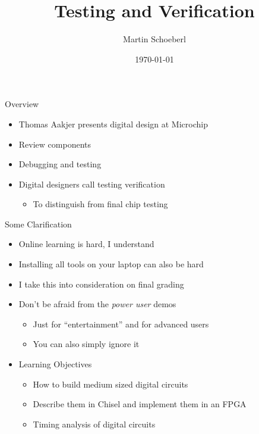 

\newif\ifbook


\title{Testing and Verification}
\author{Martin Schoeberl}
\date{\today}



\begin{frame}
\titlepage
\end{frame}

\begin{frame}[fragile]{Overview}
\begin{itemize}
\item Thomas Aakjer presents digital design at Microchip
\item Review components
\item Debugging and testing
\item Digital designers call testing verification
\begin{itemize}
\item To distinguish from final chip testing
\end{itemize}
\end{itemize}
\end{frame}

\begin{frame}[fragile]{Some Clarification}
\begin{itemize}
\item Online learning is hard, I understand
\item Installing all tools on your laptop can also be hard
\item I take this into consideration on final grading
\item Don't be afraid from the \emph{power user} demos
\begin{itemize}
\item Just for ``entertainment'' and for advanced users
\item You can also simply ignore it
\end{itemize}
\item Learning Objectives
\begin{itemize}
\item How to build medium sized digital circuits
\item Describe them in Chisel  and implement them in an FPGA
\item Timing analysis of digital circuits
\end{itemize}
\end{itemize}
\end{frame}

